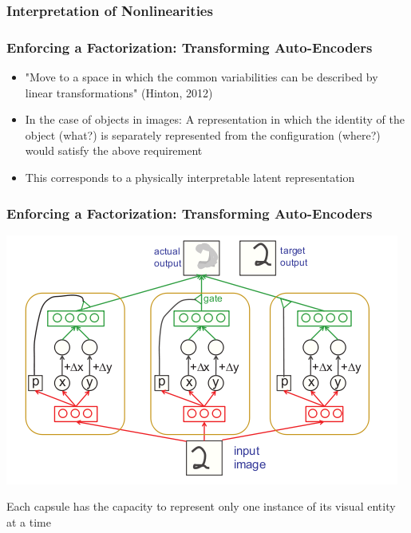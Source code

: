 \documentclass{beamer}
\begin{document}
\begin{frame} 
\frametitle{Interpretation of Nonlinearities} 

\end{frame} 

\begin{frame}
\frametitle{Enforcing a Factorization: Transforming Auto-Encoders} 
\begin{itemize}
\item{"Move to a space in which the common variabilities can be described by linear transformations" (Hinton, 2012)}
\item{In the case of objects in images: A representation in which the identity of the object (what?)  is separately represented from the configuration (where?) would satisfy the above requirement}
\item{This corresponds to a physically interpretable latent representation}
\end{itemize} 
\end{frame} 

\begin{frame}
\frametitle{Enforcing a Factorization: Transforming Auto-Encoders} 
\begin{center}
\includegraphics[scale = 0.4]{capsules.png}
\end{center}
Each capsule has the capacity to represent only one instance of its visual entity at a time
\end{frame}
\end{document}
